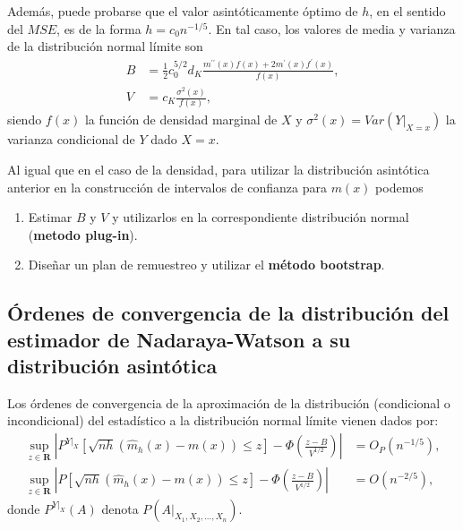 \documentclass[
]{book}
\theoremstyle{break}
\theoremstyle{definition}
\theoremstyle{definition}
\theoremstyle{definition}
\theoremstyle{remark}
\begin{document}
Además, puede probarse que el valor asintóticamente óptimo de \(h\), en el
sentido del \(MSE\), es de la forma \(h=c_{0}n^{-1/5}\). En tal caso, los
valores de media y varianza de la distribución normal límite son
\[\begin{aligned}
B &= \frac{1}{2}c_{0}^{5/2}d_{K}\frac{m^{\prime \prime }\left( x \right)
f\left( x \right) +2m^{\prime}\left( x \right) f^{\prime}\left( x \right)}{
f\left( x \right)}, \\
V &= c_{K}\frac{\sigma^2\left( x \right)}{f\left( x \right)},
\end{aligned}\]
siendo \(f\left( x \right)\) la función de densidad marginal de \(X\) y
\(\sigma^2\left( x \right) =Var\left( \left. Y\right\vert _{X=x} \right)\)
la varianza condicional de \(Y\) dado \(X=x\).

Al igual que en el caso de la densidad, para utilizar la distribución
asintótica anterior en la construcción de intervalos de confianza para
\(m\left( x \right)\) podemos

\begin{enumerate}
\def\labelenumi{\arabic{enumi}.}
\item
  Estimar \(B\) y \(V\) y utilizarlos en la correspondiente distribución
  normal (\textbf{metodo plug-in}).
\item
  Diseñar un plan de remuestreo y utilizar el \textbf{método bootstrap}.
\end{enumerate}

\hypertarget{uxf3rdenes-de-convergencia-de-la-distribuciuxf3n-del-estimador-de-nadaraya-watson-a-su-distribuciuxf3n-asintuxf3tica}{%
\subsection{Órdenes de convergencia de la distribución del estimador de Nadaraya-Watson a su distribución asintótica}\label{uxf3rdenes-de-convergencia-de-la-distribuciuxf3n-del-estimador-de-nadaraya-watson-a-su-distribuciuxf3n-asintuxf3tica}}

Los órdenes de convergencia de la aproximación de la distribución
(condicional o incondicional) del estadístico a la distribución normal
límite vienen dados por:
\[\begin{aligned}
\sup_{z\in \boldsymbol{R}}\left\vert P^{\left. Y\right\vert _{X}}\left[ 
\sqrt{nh}\left( \hat{m}_{h}\left( x \right) -m\left( x \right) \right) \leq z
\right] -\Phi \left( \frac{z-B}{V^{1/2}} \right) \right\vert &= O_{P}\left(
n^{-1/5} \right), \\
\sup_{z\in \boldsymbol{R}}\left\vert P\left[ \sqrt{nh}\left( \hat{m}
_{h}\left( x \right) -m\left( x \right) \right) \leq z\right] -\Phi \left( 
\frac{z-B}{V^{1/2}} \right) \right\vert &= O\left( n^{-2/5} \right),
\end{aligned}\]
donde \(P^{\left. Y\right\vert_{X}}\left( A \right)\) denota
\(P\left( \left. A \right\vert_{X_1,X_2,\ldots ,X_n} \right)\).
\end{document}
